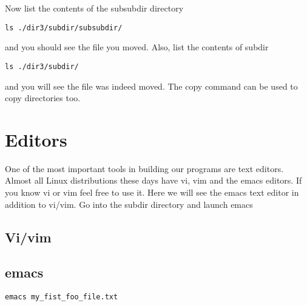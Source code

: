 \documentclass[aps,showpacs,prd,notitlepage,preprintnumbers,amsmath,amssymb,letterpaper]{revtex4}
\begin{document}
Now list the contents of the subsubdir directory

\begin{verbatim}
ls ./dir3/subdir/subsubdir/
\end{verbatim}

and you should see the file you moved. Also, list the contents of subdir

\begin{verbatim}
ls ./dir3/subdir/
\end{verbatim}

and you will see the file was indeed moved. The copy command can be
used to copy directories too.

\section{Editors}

One of the most important tools in building our programs are text
editors.  Almost all Linux distributions these days have vi, vim and
the emacs editors.  If you know vi or vim feel free to use it. Here we
will see the emacs text editor in addition to vi/vim. Go into the subdir directory and
launch emacs

\subsection{Vi/vim}



\subsection{emacs}
\begin{verbatim}
emacs my_fist_foo_file.txt
\end{verbatim}
\end{document}

